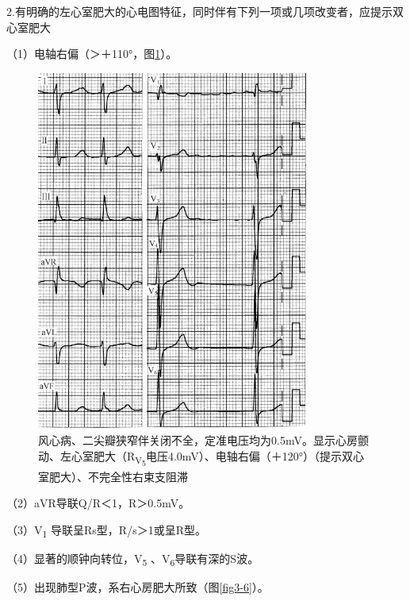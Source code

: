 2.有明确的左心室肥大的心电图特征，同时伴有下列一项或几项改变者，应提示双心室肥大

（1）电轴右偏（＞＋110°，图\ref{fig3-5}）。

\begin{figure}[!htbp]
 \centering
 \includegraphics[width=3.52083in,height=4.67708in]{./images/Image00054.jpg}
 \captionsetup{justification=centering}
 \caption{风心病、二尖瓣狭窄伴关闭不全，定准电压均为0.5mV。显示心房颤动、左心室肥大（R\textsubscript{V\textsubscript{5}}电压4.0mV）、电轴右偏（＋120°）（提示双心室肥大）、不完全性右束支阻滞}
 \label{fig3-5}
  \end{figure} 


（2）aVR导联Q/R＜1，R＞0.5mV。

（3）V\textsubscript{1} 导联呈Rs型，R/s＞1或呈R型。

（4）显著的顺钟向转位，V\textsubscript{5} 、V\textsubscript{6}导联有深的S波。

（5）出现肺型P波，系右心房肥大所致（图\ref{fig3-6}）。

